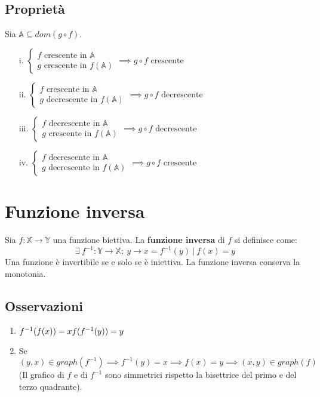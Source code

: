 \subsection{Proprietà}
Sia $\mathbb{A} \subseteq dom(g \circ f)$.
\begin{enumerate}
\item[i.] $\begin{cases}
f \text{ crescente in } \mathbb{A}\\
g \text{ crescente in } f(\mathbb{A})
\end{cases} \implies g \circ f \text{ crescente}$
\item[ii.] $\begin{cases}
f \text{ crescente in } \mathbb{A}\\
g \text{ decrescente in } f(\mathbb{A})
\end{cases} \implies g \circ f \text{ decrescente}$
\item[iii.] $\begin{cases}
f \text{ decrescente in } \mathbb{A}\\
g \text{ crescente in } f(\mathbb{A})
\end{cases} \implies g \circ f \text{ decrescente}$
\item[iv.] $\begin{cases}
f \text{ decrescente in } \mathbb{A}\\
g \text{ decrescente in } f(\mathbb{A})
\end{cases} \implies g \circ f \text{ crescente}$
\end{enumerate} 
\section{Funzione inversa}
Sia $f: \mathbb{X} \rightarrow \mathbb{Y}$ una funzione biettiva. La \textbf{funzione inversa} di $f$ si definisce come:
\begin{equation}
\exists\ f^{-1}: \mathbb{Y} \rightarrow \mathbb{X};\ y \rightarrow x = f^{-1}(y)\ |\ f(x) = y
\end{equation}
Una funzione \`e invertibile se e solo se \`e iniettiva. La funzione inversa conserva la monotonia.
\subsection{Osservazioni}
\begin{enumerate}
\item $f^{-1}(f(x))=x\\
f(f^{-1}(y))=y$
\item Se $(y,x) \in graph(f^{-1}) \implies f^{-1}(y) = x \implies f(x)=y \implies (x,y) \in graph(f)$\\
(Il grafico di $f$ e di $f^{-1}$ sono simmetrici rispetto la bisettrice del primo e del terzo quadrante).
\end{enumerate}

